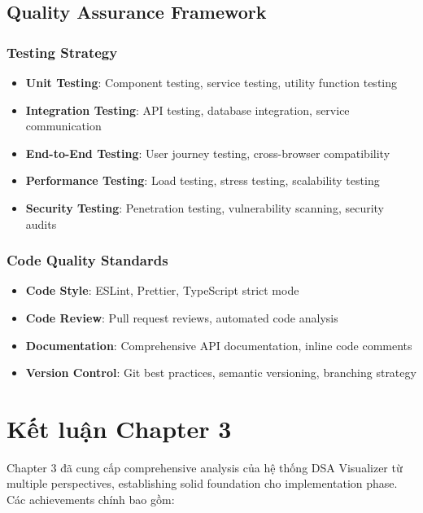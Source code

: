 \subsection{Quality Assurance Framework}
\label{subsec:quality-assurance}

\subsubsection{Testing Strategy}

\begin{itemize}
    \item \textbf{Unit Testing}: Component testing, service testing, utility function testing
    \item \textbf{Integration Testing}: API testing, database integration, service communication
    \item \textbf{End-to-End Testing}: User journey testing, cross-browser compatibility
    \item \textbf{Performance Testing}: Load testing, stress testing, scalability testing
    \item \textbf{Security Testing}: Penetration testing, vulnerability scanning, security audits
\end{itemize}

\subsubsection{Code Quality Standards}

\begin{itemize}
    \item \textbf{Code Style}: ESLint, Prettier, TypeScript strict mode
    \item \textbf{Code Review}: Pull request reviews, automated code analysis
    \item \textbf{Documentation}: Comprehensive API documentation, inline code comments
    \item \textbf{Version Control}: Git best practices, semantic versioning, branching strategy
\end{itemize}

\section{Kết luận Chapter 3}
\label{sec:chapter3-conclusion}

Chapter 3 đã cung cấp comprehensive analysis của hệ thống DSA Visualizer từ multiple perspectives, establishing solid foundation cho implementation phase. Các achievements chính bao gồm:

